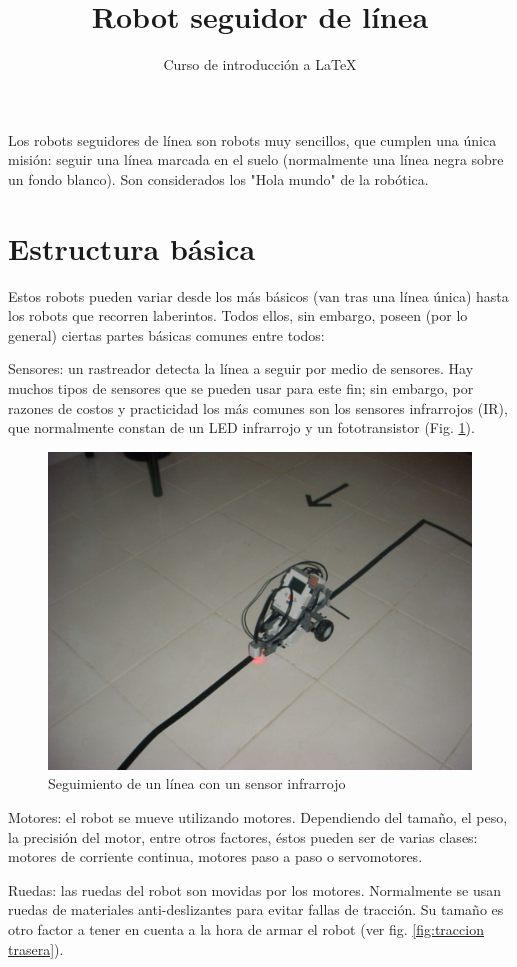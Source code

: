 \documentclass[10pt,letterpaper]{article}
\title{Robot seguidor de línea}
\author{Curso de introducción a LaTeX}
\begin{document}
\maketitle
Los robots seguidores de línea son robots muy sencillos, que cumplen una única misión: seguir una línea marcada en el suelo (normalmente una línea negra sobre un fondo blanco). Son considerados los "Hola mundo" de la robótica.

\section{Estructura básica}
Estos robots pueden variar desde los más básicos (van tras una línea única) hasta los robots que recorren laberintos. Todos ellos, sin embargo, poseen (por lo general) ciertas partes básicas comunes entre todos:

Sensores: un rastreador detecta la línea a seguir por medio de sensores. Hay muchos tipos de sensores que se pueden usar para este fin; sin embargo, por razones de costos y practicidad los más comunes son los sensores infrarrojos (IR), que normalmente constan de un LED infrarrojo y un fototransistor (Fig. \ref{fig:seguimiento}).

\begin{figure}[h]
	\centering
	\includegraphics[width=0.7\linewidth]{fig/seguimiento}
	\caption[Seguimiento de una línea]{Seguimiento de un línea con un sensor infrarrojo}
	\label{fig:seguimiento}
\end{figure}

Motores: el robot se mueve utilizando motores. Dependiendo del tamaño, el peso, la precisión del motor, entre otros factores, éstos pueden ser de varias clases: motores de corriente continua, motores paso a paso o servomotores.

Ruedas: las ruedas del robot son movidas por los motores. Normalmente se usan ruedas de materiales anti-deslizantes para evitar fallas de tracción. Su tamaño es otro factor a tener en cuenta a la hora de armar el robot (ver fig. \ref{fig:traccion trasera}).
\end{document}
